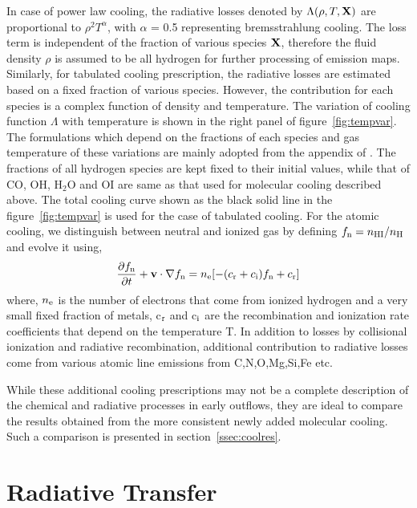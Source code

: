 \documentclass[useAMS,usenatbib,letters]{mn2e}
\begin{document}
In case of power law cooling, the radiative losses denoted by
$\Lambda(\rho,T,{\bf X})$ are proportional to
$\rho^{2}T^{\alpha}$, with $\alpha$ = 0.5 representing bremsstrahlung
cooling. The loss term is independent of the fraction of various
species ${\bf X}$, therefore the fluid density $\rho$ is assumed to be
all hydrogen for further processing of emission maps. Similarly, 
for tabulated cooling prescription, the radiative losses are estimated
based on a fixed fraction of various species. However, the contribution
for each species is a complex function of density and temperature. The
variation of cooling function $\Lambda$ with temperature is shown in
the right panel of figure~\ref{fig:tempvar}. 
The formulations which depend on the fractions of each species and gas
temperature of these variations are mainly adopted from the appendix of \cite{Smith:2003p9985}. 
The fractions of all hydrogen species are kept fixed to their initial values, while that
of CO, OH, H$_{2}$O and OI are same as that used for molecular cooling
described above. The total cooling curve shown as the black solid line
in the figure~\ref{fig:tempvar} is used for the case of tabulated
cooling. For the atomic cooling, we distinguish between neutral
and ionized gas by defining $f_{\rm n} = n_{\rm HI}/n_{\rm H}$ and
evolve it using,
\begin{equation}
\frac{\partial f_{\rm n}}{\partial t} + {\bf{v}}\cdot\nabla f_{\rm n} =
n_{\rm e} [-(c_{\rm r} + c_{\rm i})f_{\rm n} + c_{\rm r}]
\end{equation}
where, $n_{\rm e}$ is the number of electrons that come from ionized
hydrogen and a very small fixed fraction of metals, c$_{\rm r}$ and c$_{\rm i}$ are the recombination and ionization rate coefficients that depend on the temperature T. In
addition to losses by collisional ionization and radiative
recombination, additional contribution to radiative losses come from various atomic line emissions from C,N,O,Mg,Si,Fe etc.

%

While these additional cooling prescriptions may not be a complete description of
the chemical and radiative processes in early outflows, they are ideal
to compare the results obtained from the more consistent newly added molecular
cooling. Such a comparison is presented in section~\ref{ssec:coolres}.


\section{Radiative Transfer}
\label{sec:radtrans}
\end{document}
